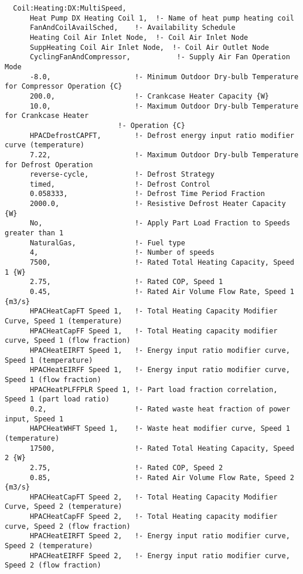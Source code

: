 \begin{lstlisting}
  Coil:Heating:DX:MultiSpeed,
      Heat Pump DX Heating Coil 1,  !- Name of heat pump heating coil
      FanAndCoilAvailSched,    !- Availability Schedule
      Heating Coil Air Inlet Node,  !- Coil Air Inlet Node
      SuppHeating Coil Air Inlet Node,  !- Coil Air Outlet Node
      CyclingFanAndCompressor,           !- Supply Air Fan Operation Mode
      -8.0,                    !- Minimum Outdoor Dry-bulb Temperature for Compressor Operation {C}
      200.0,                   !- Crankcase Heater Capacity {W}
      10.0,                    !- Maximum Outdoor Dry-bulb Temperature for Crankcase Heater
                           !- Operation {C}
      HPACDefrostCAPFT,        !- Defrost energy input ratio modifier curve (temperature)
      7.22,                    !- Maximum Outdoor Dry-bulb Temperature for Defrost Operation
      reverse-cycle,           !- Defrost Strategy
      timed,                   !- Defrost Control
      0.058333,                !- Defrost Time Period Fraction
      2000.0,                  !- Resistive Defrost Heater Capacity {W}
      No,                      !- Apply Part Load Fraction to Speeds greater than 1
      NaturalGas,              !- Fuel type
      4,                       !- Number of speeds
      7500,                    !- Rated Total Heating Capacity, Speed 1 {W}
      2.75,                    !- Rated COP, Speed 1
      0.45,                    !- Rated Air Volume Flow Rate, Speed 1 {m3/s}
      HPACHeatCapFT Speed 1,   !- Total Heating Capacity Modifier Curve, Speed 1 (temperature)
      HPACHeatCapFF Speed 1,   !- Total Heating capacity modifier curve, Speed 1 (flow fraction)
      HPACHeatEIRFT Speed 1,   !- Energy input ratio modifier curve, Speed 1 (temperature)
      HPACHeatEIRFF Speed 1,   !- Energy input ratio modifier curve, Speed 1 (flow fraction)
      HPACHeatPLFFPLR Speed 1, !- Part load fraction correlation, Speed 1 (part load ratio)
      0.2,                     !- Rated waste heat fraction of power input, Speed 1
      HAPCHeatWHFT Speed 1,    !- Waste heat modifier curve, Speed 1 (temperature)
      17500,                   !- Rated Total Heating Capacity, Speed 2 {W}
      2.75,                    !- Rated COP, Speed 2
      0.85,                    !- Rated Air Volume Flow Rate, Speed 2 {m3/s}
      HPACHeatCapFT Speed 2,   !- Total Heating Capacity Modifier Curve, Speed 2 (temperature)
      HPACHeatCapFF Speed 2,   !- Total Heating capacity modifier curve, Speed 2 (flow fraction)
      HPACHeatEIRFT Speed 2,   !- Energy input ratio modifier curve, Speed 2 (temperature)
      HPACHeatEIRFF Speed 2,   !- Energy input ratio modifier curve, Speed 2 (flow fraction)

\end{lstlisting}
